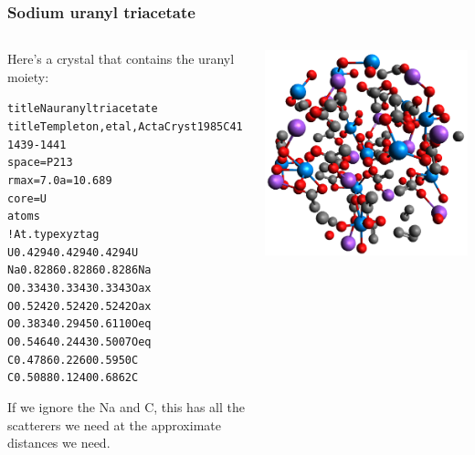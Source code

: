 \documentclass[10pt, xcolor=x11names, compress]{beamer}
\begin{document}
\begin{frame}[fragile]
  \frametitle{Sodium uranyl triacetate}
  \begin{columns}[T]
    \begin{column}{0.7\linewidth}
      Here's a crystal that contains the uranyl moiety:
      \begin{center}
        \begin{minipage}{0.75\linewidth}
          \begin{block}{}
            \tiny
            \begin{alltt}
{\color{Green4}title Na uranyl triacetate}
{\color{Green4}title Templeton, et al, Acta Cryst 1985 C41 1439-1441}
{\color{SteelBlue4}space} = P 21 3
{\color{SteelBlue4}rmax}  = 7.0    {\color{SteelBlue4}a}=10.689
{\color{SteelBlue4}core}  = U
{\color{Purple4}atoms}
{\color{Blue4}! At.type   x         y         z      tag}
  U        0.4294    0.4294    0.4294  U 
  Na       0.8286    0.8286    0.8286  Na
  O        0.3343    0.3343    0.3343  Oax
  O        0.5242    0.5242    0.5242  Oax
  O        0.3834    0.2945    0.6110  Oeq
  O        0.5464    0.2443    0.5007  Oeq
  C        0.4786    0.2260    0.5950  C
  C        0.5088    0.1240    0.6862  C 
            \end{alltt}
          \end{block}
        \end{minipage}
      \end{center}
      If we ignore the Na and C, this has all the scatterers we need
      at the approximate distances we need.
    \end{column}
    \begin{column}{0.3\linewidth}
      \includegraphics[width=\linewidth]{../ATEA/mfc/NaU_triacetate_full.png}


\end{column}
\end{columns}
\end{frame}
\end{document}
